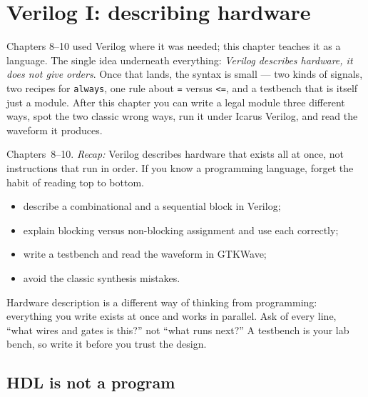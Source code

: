 \chapter{Verilog I: describing hardware}\label{ch:verilog1}

Chapters 8--10 used Verilog where it was needed; this chapter teaches it
as a language. The single idea underneath everything: \emph{Verilog
describes hardware, it does not give orders}. Once that lands, the
syntax is small --- two kinds of signals, two recipes for
\texttt{always}, one rule about \texttt{=} versus \texttt{<=}, and a
testbench that is itself just a module. After this chapter you can write
a legal module three different ways, spot the two classic wrong ways,
run it under Icarus Verilog, and read the waveform it produces.

\begin{rulebox}
Chapters~8--10. \emph{Recap:} Verilog describes hardware that exists all at once, not instructions that run in order. If you know a programming language, forget the habit of reading top to bottom.
\end{rulebox}
\begin{wins}
\begin{itemize}
\item describe a combinational and a sequential block in Verilog;
\item explain blocking versus non-blocking assignment and use each correctly;
\item write a testbench and read the waveform in GTKWave;
\item avoid the classic synthesis mistakes.
\end{itemize}
\end{wins}
\begin{principle}
Hardware description is a different way of thinking from programming: everything you write exists at once and works in parallel. Ask of every line, ``what wires and gates is this?'' not ``what runs next?'' A testbench is your lab bench, so write it before you trust the design.
\end{principle}

\section{HDL is not a program}\label{sec:hdlmind}

